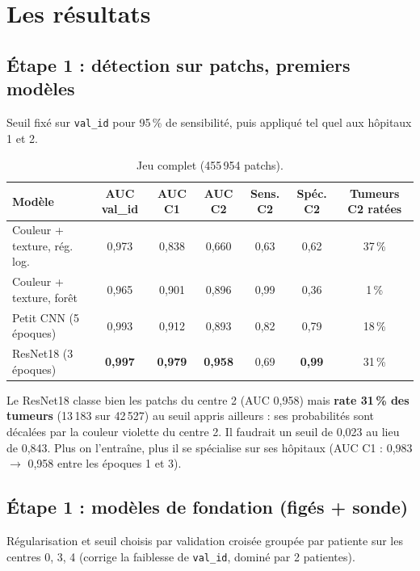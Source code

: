 \documentclass[11pt,a4paper]{article}
\newcommand{\best}[1]{\textbf{#1}}
\begin{document}
\section{Les résultats}

\subsection{Étape 1 : détection sur patchs, premiers modèles}\label{sec:etape1}
Seuil fixé sur \texttt{val\_id} pour 95\,\% de sensibilité, puis appliqué tel quel aux hôpitaux 1 et 2.

\begin{table}[H]
\centering
\footnotesize\setlength{\tabcolsep}{4pt}
\begin{tabular}{lcccccc}
\toprule
\textbf{Modèle} & \textbf{AUC val\_id} & \textbf{AUC C1} & \textbf{AUC C2} & \textbf{Sens. C2} & \textbf{Spéc. C2} & \textbf{Tumeurs C2 ratées} \\
\midrule
Couleur + texture, rég. log. & 0,973 & 0,838 & 0,660 & 0,63 & 0,62 & 37\,\% \\
Couleur + texture, forêt & 0,965 & 0,901 & 0,896 & 0,99 & 0,36 & 1\,\% \\
Petit CNN (5 époques) & 0,993 & 0,912 & 0,893 & 0,82 & 0,79 & 18\,\% \\
ResNet18 (3 époques) & \best{0,997} & \best{0,979} & \best{0,958} & 0,69 & \best{0,99} & 31\,\% \\
\bottomrule
\end{tabular}
\caption{Jeu complet (455\,954 patchs).}
\end{table}

\begin{constat}
Le ResNet18 classe bien les patchs du centre 2 (AUC 0,958) mais \textbf{rate 31\,\% des tumeurs} (13\,183 sur 42\,527) au seuil appris
ailleurs : ses probabilités sont décalées par la couleur violette du centre 2. Il faudrait un seuil de 0,023 au lieu de 0,843.
Plus on l'entraîne, plus il se spécialise sur ses hôpitaux (AUC C1 : 0,983 $\to$ 0,958 entre les époques 1 et 3).
\end{constat}

\subsection{Étape 1 : modèles de fondation (figés + sonde)}
Régularisation et seuil choisis par validation croisée groupée par patiente sur les centres 0, 3, 4 (corrige la faiblesse
de \texttt{val\_id}, dominé par 2 patientes).
\end{document}
